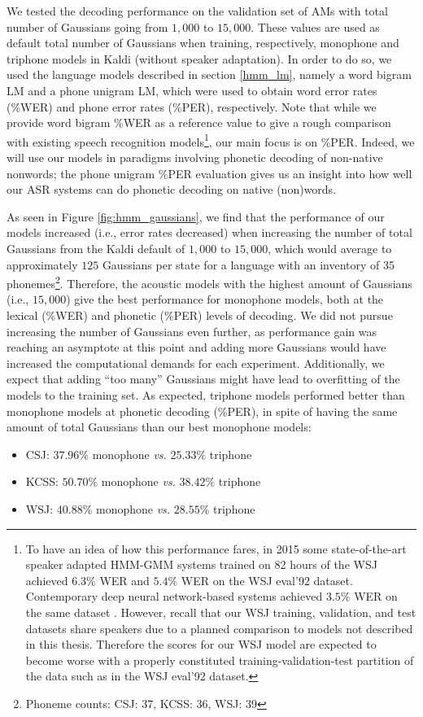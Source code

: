We tested the decoding performance on the validation set of AMs with total number of Gaussians going from $1,000$ to $15,000$. These values are used as default total number of Gaussians when training, respectively, monophone and triphone models in Kaldi (without speaker adaptation).
In order to do so, we used the language models described in section \ref{hmm_lm}, namely a word bigram LM and a phone unigram LM, which were used to obtain word error rates (\%WER) and phone error rates (\%PER), respectively. Note that while we provide word bigram \%WER as a reference value to give a rough comparison with existing speech recognition models\footnote{To have an idea of how this performance fares, in 2015 some state-of-the-art speaker adapted HMM-GMM systems trained on 82 hours of the WSJ achieved $6.3\%$ WER \cite{panayotov2015} and $5.4\%$ WER \cite{chan2015} on the WSJ eval'92 dataset. Contemporary deep neural network-based systems achieved $3.5\%$ WER on the same dataset \cite{chan2015}. However, recall that our WSJ training, validation, and test datasets share speakers due to a planned comparison to models not described in this thesis. Therefore the scores for our WSJ model are expected to become worse with a properly constituted training-validation-test partition of the data such as in the WSJ eval'92 dataset.}, our main focus is on \%PER. Indeed, we will use our models in paradigms involving phonetic decoding of non-native nonwords; the phone unigram \%PER evaluation gives us an insight into how well our ASR systems can do phonetic decoding on native (non)words. 

As seen in Figure \ref{fig:hmm_gaussians}, we find that the performance of our models increased (i.e., error rates decreased) when increasing the number of total Gaussians from the Kaldi default of $1,000$ to $15,000$, which would average to approximately $125$ Gaussians per state for a language with an inventory of 35 phonemes\footnote{Phoneme counts: CSJ: 37, KCSS: 36, WSJ: 39}.   
Therefore, the acoustic models with the highest amount of Gaussians (i.e., $15,000$) give the best performance for monophone models, both at the lexical (\%WER) and phonetic (\%PER) levels of decoding.
We did not pursue increasing the number of Gaussians even further, as performance gain was reaching an asymptote at this point and adding more Gaussians would have increased the computational demands for each experiment. Additionally, we expect that adding ``too many'' Gaussians might have lead to overfitting of the models to the training set.
As expected, triphone models performed better than monophone models at phonetic decoding (\%PER), in spite of having the same amount of total Gaussians than our best monophone models:
\begin{itemize}
\item CSJ: $37.96\%$ monophone \textit{vs.} $25.33\%$ triphone
\item KCSS: $50.70\%$ monophone \textit{vs.} $38.42\%$ triphone
 \item WSJ: $40.88\%$ monophone \textit{vs.} $28.55\%$ triphone 
  \end{itemize}

